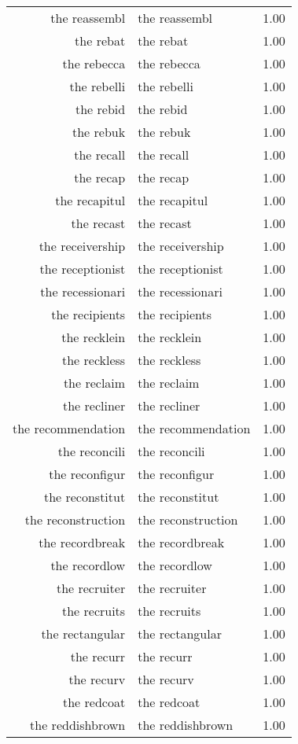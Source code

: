 \begin{table}[ht]
\begin{tabular}{rlr}
  the reassembl & the reassembl & 1.00 \\ 
  the rebat & the rebat & 1.00 \\ 
  the rebecca & the rebecca & 1.00 \\ 
  the rebelli & the rebelli & 1.00 \\ 
  the rebid & the rebid & 1.00 \\ 
  the rebuk & the rebuk & 1.00 \\ 
  the recall & the recall & 1.00 \\ 
  the recap & the recap & 1.00 \\ 
  the recapitul & the recapitul & 1.00 \\ 
  the recast & the recast & 1.00 \\ 
  the receivership & the receivership & 1.00 \\ 
  the receptionist & the receptionist & 1.00 \\ 
  the recessionari & the recessionari & 1.00 \\ 
  the recipients & the recipients & 1.00 \\ 
  the recklein & the recklein & 1.00 \\ 
  the reckless & the reckless & 1.00 \\ 
  the reclaim & the reclaim & 1.00 \\ 
  the recliner & the recliner & 1.00 \\ 
  the recommendation & the recommendation & 1.00 \\ 
  the reconcili & the reconcili & 1.00 \\ 
  the reconfigur & the reconfigur & 1.00 \\ 
  the reconstitut & the reconstitut & 1.00 \\ 
  the reconstruction & the reconstruction & 1.00 \\ 
  the recordbreak & the recordbreak & 1.00 \\ 
  the recordlow & the recordlow & 1.00 \\ 
  the recruiter & the recruiter & 1.00 \\ 
  the recruits & the recruits & 1.00 \\ 
  the rectangular & the rectangular & 1.00 \\ 
  the recurr & the recurr & 1.00 \\ 
  the recurv & the recurv & 1.00 \\ 
  the redcoat & the redcoat & 1.00 \\ 
  the reddishbrown & the reddishbrown & 1.00 \\ 

\end{tabular}
\end{table}
